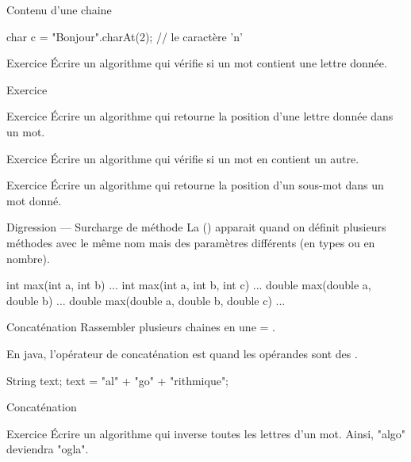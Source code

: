 \begin{hideedit}
\begin{frame}[fragile]{Contenu d'une chaine}
  \vfill
  \begin{java}
char c = "Bonjour".charAt(2);  // le caractère 'n'
  \end{java}

  \vfill
  \pause
  \begin{block}{Exercice}
    Écrire un algorithme qui vérifie si un mot contient une lettre donnée.
  \end{block}
\end{frame}

\begin{frame}{Exercice}
  \begin{block}{Exercice}
    Écrire un algorithme qui retourne la position d'une lettre donnée dans
    un mot.
  \end{block}
  \begin{block}{Exercice}
    Écrire un algorithme qui vérifie si un mot en contient un autre.
  \end{block}
  \begin{block}{Exercice}
    Écrire un algorithme qui retourne la position d'un sous-mot dans
    un mot donné.
  \end{block}
\end{frame}

\begin{frame}[fragile]{Digression --- Surcharge de méthode}
  La  (\textit{}) apparait quand on définit plusieurs méthodes avec le
  même nom mais des paramètres différents (en types ou en nombre).

  \begin{java}
    int max(int a, int b) { ... }
    int max(int a, int b, int c) { ... }
    double max(double a, double b) { ... }
    double max(double a, double b, double c) { ... }
  \end{java}
\end{frame}

\begin{frame}[fragile]{Concaténation}
  Rassembler plusieurs chaines en une = .

  En java, l'opérateur de concaténation est \pc{+} quand les opérandes
  sont des .

  \begin{java}
String text;
text = "al" + "go" + "rithmique";
  \end{java}
\end{frame}

\begin{frame}[fragile]{Concaténation}
  \begin{block}{Exercice}
    Écrire un algorithme qui inverse toutes les lettres d'un mot.
    Ainsi, "algo" deviendra "ogla".
  \end{block}


\end{frame}
\end{hideedit}
